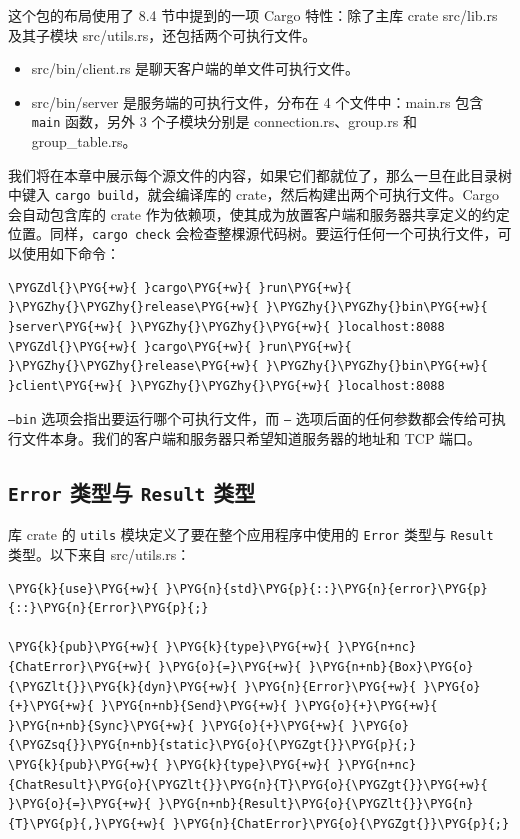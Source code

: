 这个包的布局使用了 8.4 节中提到的一项 Cargo 特性：除了主库 crate src/lib.rs 及其子模块 src/utils.rs，还包括两个可执行文件。

\begin{itemize}
\item src/bin/client.rs 是聊天客户端的单文件可执行文件。
\item src/bin/server 是服务端的可执行文件，分布在 4 个文件中：main.rs 包含 \texttt{main} 函数，另外 3 个子模块分别是 connection.rs、group.rs 和 group\_table.rs。
\end{itemize}

我们将在本章中展示每个源文件的内容，如果它们都就位了，那么一旦在此目录树中键入 \texttt{cargo build}，就会编译库的 crate，然后构建出两个可执行文件。Cargo 会自动包含库的 crate 作为依赖项，使其成为放置客户端和服务器共享定义的约定位置。同样，\texttt{cargo check} 会检查整棵源代码树。要运行任何一个可执行文件，可以使用如下命令：

\begin{Verbatim}[commandchars=\\\{\},breaklines=true,breakanywhere=true,fontsize=\codefont,xleftmargin=17bp]
\PYGZdl{}\PYG{+w}{ }cargo\PYG{+w}{ }run\PYG{+w}{ }\PYGZhy{}\PYGZhy{}release\PYG{+w}{ }\PYGZhy{}\PYGZhy{}bin\PYG{+w}{ }server\PYG{+w}{ }\PYGZhy{}\PYGZhy{}\PYG{+w}{ }localhost:8088
\PYGZdl{}\PYG{+w}{ }cargo\PYG{+w}{ }run\PYG{+w}{ }\PYGZhy{}\PYGZhy{}release\PYG{+w}{ }\PYGZhy{}\PYGZhy{}bin\PYG{+w}{ }client\PYG{+w}{ }\PYGZhy{}\PYGZhy{}\PYG{+w}{ }localhost:8088
\end{Verbatim}

\texttt{--bin} 选项会指出要运行哪个可执行文件，而 \texttt{--} 选项后面的任何参数都会传给可执行文件本身。我们的客户端和服务器只希望知道服务器的地址和 TCP 端口。

\subsection{\texttt{Error} 类型与 \texttt{Result} 类型}

库 crate 的 \texttt{utils} 模块定义了要在整个应用程序中使用的 \texttt{Error} 类型与 \texttt{Result} 类型。以下来自 src/utils.rs：

\begin{Verbatim}[commandchars=\\\{\},breaklines=true,breakanywhere=true,fontsize=\codefont,xleftmargin=17bp]
\PYG{k}{use}\PYG{+w}{ }\PYG{n}{std}\PYG{p}{::}\PYG{n}{error}\PYG{p}{::}\PYG{n}{Error}\PYG{p}{;}

\PYG{k}{pub}\PYG{+w}{ }\PYG{k}{type}\PYG{+w}{ }\PYG{n+nc}{ChatError}\PYG{+w}{ }\PYG{o}{=}\PYG{+w}{ }\PYG{n+nb}{Box}\PYG{o}{\PYGZlt{}}\PYG{k}{dyn}\PYG{+w}{ }\PYG{n}{Error}\PYG{+w}{ }\PYG{o}{+}\PYG{+w}{ }\PYG{n+nb}{Send}\PYG{+w}{ }\PYG{o}{+}\PYG{+w}{ }\PYG{n+nb}{Sync}\PYG{+w}{ }\PYG{o}{+}\PYG{+w}{ }\PYG{o}{\PYGZsq{}}\PYG{n+nb}{static}\PYG{o}{\PYGZgt{}}\PYG{p}{;}
\PYG{k}{pub}\PYG{+w}{ }\PYG{k}{type}\PYG{+w}{ }\PYG{n+nc}{ChatResult}\PYG{o}{\PYGZlt{}}\PYG{n}{T}\PYG{o}{\PYGZgt{}}\PYG{+w}{ }\PYG{o}{=}\PYG{+w}{ }\PYG{n+nb}{Result}\PYG{o}{\PYGZlt{}}\PYG{n}{T}\PYG{p}{,}\PYG{+w}{ }\PYG{n}{ChatError}\PYG{o}{\PYGZgt{}}\PYG{p}{;}
\end{Verbatim}

